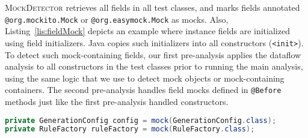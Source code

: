

\textsc{MockDetector} retrieves all fields in all test classes, and marks fields annotated {\tt @org.mockito.Mock} or {\tt @org.easymock.Mock} as mocks. Also, Listing~\ref{lis:fieldMock} depicts an example where instance fields are initialized using field initializers. Java copies such initializers into all constructors (\texttt{<init>}). To detect such mock-containing fields, our first pre-analysis applies the dataflow analysis to all constructors in the test classes prior to running the main analysis, using the same logic that we use to detect mock objects or mock-containing containers. The second pre-analysis handles field mocks defined in \texttt{@Before} methods just like the first pre-analysis handled constructors.





\begin{lstlisting}[basicstyle=\ttfamily, caption={Field mocks defined by field initializations from \texttt{TypeRuleTest} \\ in jsonschema2pojo.},
basicstyle=\scriptsize\ttfamily,language = Java, framesep=4.5mm,
framexleftmargin=1mm, captionpos=b, label=lis:fieldMock, numbers=none]
private GenerationConfig config = mock(GenerationConfig.class);
private RuleFactory ruleFactory = mock(RuleFactory.class);
\end{lstlisting}

